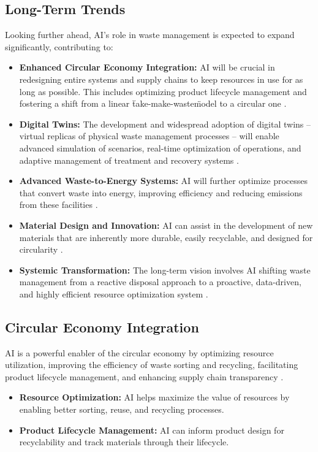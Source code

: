 \subsection{Long-Term Trends}
Looking further ahead, AI's role in waste management is expected to expand significantly, contributing to:
\begin{itemize}
    \item \textbf{Enhanced Circular Economy Integration:}
AI will be crucial in redesigning entire systems and supply chains to keep resources in use for as long as possible. This includes optimizing product lifecycle management and fostering a shift from a linear \"take-make-waste\" model to a circular one \cite{SunSkips_FutureTrends, Forbes_FutureTrends}.
    \item \textbf{Digital Twins:}
The development and widespread adoption of digital twins – virtual replicas of physical waste management processes – will enable advanced simulation of scenarios, real-time optimization of operations, and adaptive management of treatment and recovery systems \cite{QUB_FutureTrends, Reapress_FutureTrends}.
    \item \textbf{Advanced Waste-to-Energy Systems:}
AI will further optimize processes that convert waste into energy, improving efficiency and reducing emissions from these facilities \cite{Stellarix_FutureTrends}.
    \item \textbf{Material Design and Innovation:}
AI can assist in the development of new materials that are inherently more durable, easily recyclable, and designed for circularity \cite{SustainabilityDirectory_FutureTrends_1}.
    \item \textbf{Systemic Transformation:}
The long-term vision involves AI shifting waste management from a reactive disposal approach to a proactive, data-driven, and highly efficient resource optimization system \cite{TechGolly_FutureTrends}.
\end{itemize}

\subsection{Circular Economy Integration}
AI is a powerful enabler of the circular economy by optimizing resource utilization, improving the efficiency of waste sorting and recycling, facilitating product lifecycle management, and enhancing supply chain transparency \cite{Lurtis_CircularEconomy}.
\begin{itemize}
    \item \textbf{Resource Optimization:}
AI helps maximize the value of resources by enabling better sorting, reuse, and recycling processes.
    \item \textbf{Product Lifecycle Management:}
AI can inform product design for recyclability and track materials through their lifecycle.
\end{itemize}

